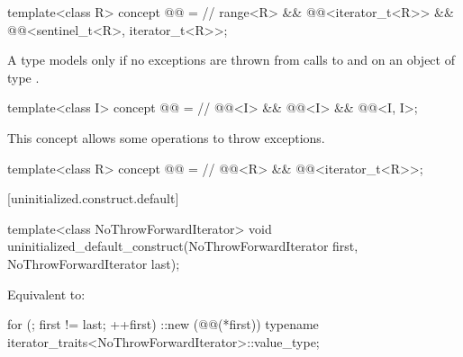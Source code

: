 \begin{itemdecl}
template<class R>
concept @@ = // \expos
  range<R> &&
  @@<iterator_t<R>> &&
  @@<sentinel_t<R>, iterator_t<R>>;
\end{itemdecl}

\begin{itemdescr}
\pnum
A type  models  only if
no exceptions are thrown from calls to  and
 on an object of type .
\end{itemdescr}

\begin{itemdecl}
template<class I>
concept @@ = // \expos
  @@<I> &&
  @@<I> &&
  @@<I, I>;
\end{itemdecl}

\begin{itemdescr}
\pnum
\begin{note}
This concept allows some 
operations to throw exceptions.
\end{note}
\end{itemdescr}

\begin{itemdecl}
template<class R>
concept @@ = // \expos
  @@<R> &&
  @@<iterator_t<R>>;
\end{itemdecl}

[uninitialized.construct.default]{}

%
\begin{itemdecl}
template<class NoThrowForwardIterator>
  void uninitialized_default_construct(NoThrowForwardIterator first, NoThrowForwardIterator last);
\end{itemdecl}

\begin{itemdescr}
\pnum
\effects
Equivalent to:
\begin{codeblock}
for (; first != last; ++first)
  ::new (@@(*first))
    typename iterator_traits<NoThrowForwardIterator>::value_type;
\end{codeblock}
\end{itemdescr}

